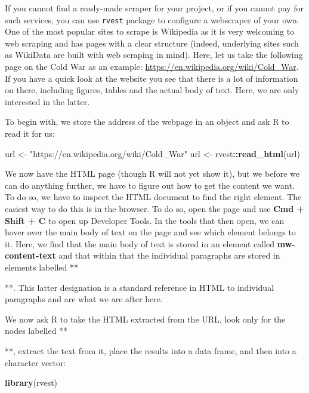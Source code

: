 \documentclass[
]{book}
\newenvironment{Shaded}{\begin{snugshade}}{\end{snugshade}}
\newcommand{\FunctionTok}[1]{\textcolor[rgb]{0.13,0.29,0.53}{\textbf{#1}}}
\newcommand{\NormalTok}[1]{#1}
\newcommand{\OtherTok}[1]{\textcolor[rgb]{0.56,0.35,0.01}{#1}}
\newcommand{\SpecialCharTok}[1]{\textcolor[rgb]{0.81,0.36,0.00}{\textbf{#1}}}
\newcommand{\StringTok}[1]{\textcolor[rgb]{0.31,0.60,0.02}{#1}}
\begin{document}
If you cannot find a ready-made scraper for your project, or if you cannot pay for such services, you can use \texttt{rvest} package to configure a webscraper of your own. One of the most popular sites to scrape is Wikipedia as it is very welcoming to web scraping and has pages with a clear structure (indeed, underlying sites such as WikiData are built with web scraping in mind). Here, let us take the following page on the Cold War as an example: \url{https://en.wikipedia.org/wiki/Cold_War}. If you have a quick look at the website you see that there is a lot of information on there, including figures, tables and the actual body of text. Here, we are only interested in the latter.

To begin with, we store the address of the webpage in an object and ask R to read it for us:

\begin{Shaded}
\begin{Highlighting}[]
\NormalTok{url }\OtherTok{\textless{}{-}} \StringTok{"https://en.wikipedia.org/wiki/Cold\_War"}
\NormalTok{url }\OtherTok{\textless{}{-}}\NormalTok{ rvest}\SpecialCharTok{::}\FunctionTok{read\_html}\NormalTok{(url)}
\end{Highlighting}
\end{Shaded}

We now have the HTML page (though R will not yet show it), but we before we can do anything further, we have to figure out how to get the content we want. To do so, we have to inspect the HTML document to find the right element. The easiest way to do this is in the browser. To do so, open the page and use \textbf{Cmd + Shift + C} to open up Developer Tools. In the tools that then open, we can hover over the main body of text on the page and see which element belongs to it. Here, we find that the main body of text is stored in an element called \textbf{mw-content-text} and that within that the individual paragraphs are stored in elements labelled **

**. This latter designation is a standard reference in HTML to individual paragraphs and are what we are after here.

We now ask R to take the HTML extracted from the URL, look only for the nodes labelled **

**, extract the text from it, place the results into a data frame, and then into a character vector:

\begin{Shaded}
\begin{Highlighting}[]
\FunctionTok{library}\NormalTok{(rvest)}
\end{Highlighting}
\end{Shaded}
\end{document}
